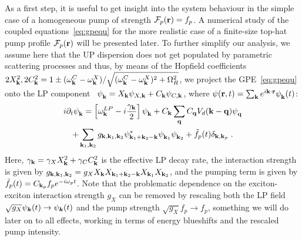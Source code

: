 As a first step, it is useful to get insight into the system behaviour
in the simple case of a homogeneous pump of strength
$\mathcal{F}_p(\mathbf{r}) = f_p$. A numerical study of the coupled
equations~\eqref{eq:gpequ} for the more realistic case of a
finite-size top-hat pump profile $\mathcal{F}_p(\mathbf{r})$ will be
presented later.
%
To further simplify our analysis, we assume here that the UP
dispersion does not get populated by parametric scattering processes
and thus, by means of the Hopfield coefficients $2X_{\mathbf{k}}^2,
2C_{\mathbf{k}}^2 = 1 \pm (\omega_{\mathbf{k}}^{C} -
\omega_{\mathbf{k}}^{X})/\sqrt{(\omega_{\mathbf{k}}^{C} -
  \omega_{\mathbf{k}}^{X})^2 + \Omega_R^2}$, we project the
GPE~\eqref{eq:gpequ} onto the LP
component~\cite{Ciuti_2001,Wouters_2007_b} $\psi_{\mathbf{k}}^{} =
X_{\mathbf{k}} \psi_{X,\mathbf{k}} + C_{\mathbf{k}} \psi_{C,\mathbf{k}}$,
where $\psi(\mathbf{r},t) = \sum_{\mathbf{k}} e^{i\mathbf{k}\cdot \mathbf{r}}
\psi_{\mathbf{k}}^{} (t)$:
%
\begin{multline}
  i\partial_t \psi_{\mathbf{k}}^{} = \left[\omega_{\mathbf{k}}^{LP} -
    i\frac{\gamma_{\mathbf{k}}}{2}\right]\psi_{\mathbf{k}}^{} +
  C_{\mathbf{k}} \sum_{\mathbf{q}} C_{\mathbf{q}} V_d(\mathbf{k} - \mathbf{q})
  \psi_{\mathbf{q}}^{}\\ + \sum_{\mathbf{k}_1, \mathbf{k}_2} g_{\mathbf{k},
    \mathbf{k}_1, \mathbf{k}_2} \psi^*_{\mathbf{k}_1 + \mathbf{k}_2-\mathbf{k}}
  \psi_{\mathbf{k}_1}^{} \psi_{\mathbf{k}_2}^{} + \tilde{f}_p(t)
  \delta_{\mathbf{k},\mathbf{k}_p}\; .
\label{eq:efflp}
\end{multline}
%
Here, $\gamma_{\mathbf{k}}=\gamma_X X_{\mathbf{k}}^2 + \gamma_C C_{\mathbf{k}}^2$
is the effective LP decay rate, the interaction strength is given by
$g_{\mathbf{k}, \mathbf{k}_1, \mathbf{k}_2}=g_X X_{\mathbf{k}} X_{\mathbf{k}_1 +
  \mathbf{k}_2-\mathbf{k}} X_{\mathbf{k}_1} X_{\mathbf{k}_2}$, and the pumping term is
given by $\tilde{f}_p(t)= C_{\mathbf{k}_p} f_p e^{-i\omega_p t}$. Note
that the problematic dependence on the exciton-exciton interaction
strength $g_X$ can be removed by rescaling both the LP field
$\sqrt{g_X}\psi_{\bm{k}}(t) \rightarrow \psi_{\bm{k}}(t)$ and the pump
strength $\sqrt{g_X}f_p \rightarrow f_p$, something we will do later
on to all effects, working in terms of energy blueshifts and the
rescaled pump intensity.
%
